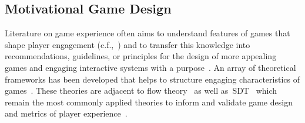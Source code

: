 \subsection{Motivational Game Design}
Literature on game experience often aims to understand features of games that shape player engagement (c.f.,~\cite{yee2016, schell2008}) and to transfer this knowledge into recommendations, guidelines, or principles for the design of more appealing games and engaging interactive systems with a purpose~\cite{boyle2012, deterding2011}.
An array of theoretical frameworks has been developed that helps to structure engaging characteristics of games~\cite{boyle2012, tyack2020}.
These theories are adjacent to flow theory~\cite{csikszentmihalyi1990} as well as~\ac{SDT}~\cite{ryan2000} which remain the most commonly applied theories to inform and validate game design and metrics of player experience~\cite{boyle2012,tyack2020}.

